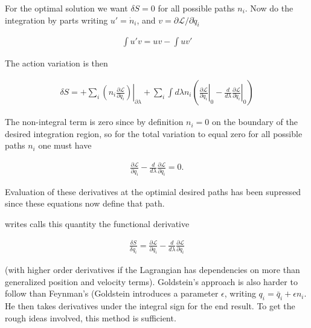 \documentclass{article}
\newcommand{\LL}[0]{\mathcal{L}}
\newcommand{\qdot}[0]{\dot{q}}
\newcommand{\ndot}[0]{\dot{n}}
\newcommand{\qbar}[0]{\bar{q}}
\newcommand{\PD}[2]{\frac{\partial {#2}}{\partial {#1}}}
\begin{document}
For the optimal solution we want $\delta S = 0$ for all possible paths $n_i$.  Now do the integration by parts writing
$u' = \ndot_i$, and $v = \partial \LL/{\partial \qdot_i}$ 

\begin{align*}
\int u' v = u v - \int u v'
\end{align*}

The action variation is then

\begin{align*}
\delta S =
+ \sum_i \left. \left( n_i \PD{\qdot_i}{\LL} \right) \right\vert_{\partial \lambda}
+ \sum_i \int d\lambda n_i
\left(
\left. \PD{q_i}{\LL} \right\vert_0
-\frac{d}{d\lambda} \left. \PD{\qdot_i}{\LL} \right\vert_0
\right)
\end{align*}

The non-integral term is zero since by definition $n_i = 0$ on the boundary of the desired integration region, so for the
total variation to equal zero for all possible paths $n_i$ one must have

\begin{align*}
\PD{q_i}{\LL} -\frac{d}{d\lambda} \PD{\qdot_i}{\LL} = 0.
\end{align*}

Evaluation of these derivatives at the optimial desired paths has been supressed since these equations now define that path.

\cite{goldstein1951cm} writes calls this quantity the functional derivative

\begin{align*}
\frac{\delta S}{\delta q_i} = \PD{q_i}{\LL} -\frac{d}{d\lambda} \PD{\qdot_i}{\LL}
\end{align*}

(with higher order derivatives if the Lagrangian has dependencies on more than generalized position and velocity terms).  Goldstein's 
approach is also harder to follow than Feynman's (Goldstein introduces a parameter $\epsilon$, writing $q_i = \qbar_i + \epsilon n_i$.  He then takes derivatives under the integral sign for the end result.  To get the rough ideas involved, this method is sufficient.


\end{document}

